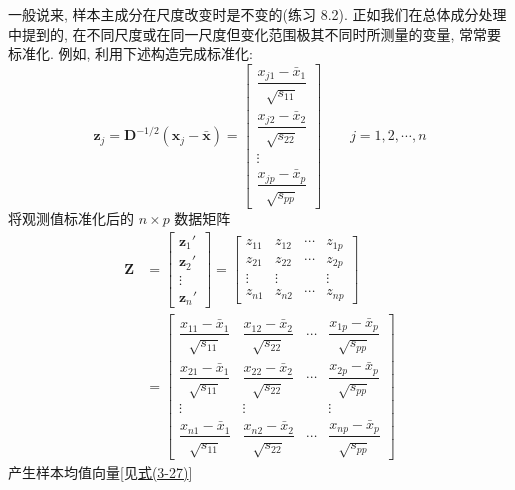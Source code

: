 一般说来, 样本主成分在尺度改变时是不变的(练习 8.2). 正如我们在总体成分处理中提到的, 在不同尺度或在同一尺度但变化范围极其不同时所测量的变量, 常常要标准化. 例如, 利用下述构造完成标准化:
\label{eq:8-25}
\begin{equation}
\mathbf{z}_j=\mathbf{D}^{-1/2}(\mathbf{x}_j-\bar{\mathbf{x}})=
\begin{bmatrix}
\dfrac{x_{j1}-\bar{x}_1}{\sqrt{s_{11}}}\\[6pt]
\dfrac{x_{j2}-\bar{x}_2}{\sqrt{s_{22}}}\\[6pt]
\vdots\\[4pt]
\dfrac{x_{jp}-\bar{x}_p}{\sqrt{s_{pp}}}
\end{bmatrix}
\qquad j=1,2,\cdots,n \tag{8-25}
\end{equation}
将观测值标准化后的 $n\times p$ 数据矩阵
\label{eq:8-26}
\begin{equation}
\begin{aligned}
\mathbf{Z}&=\begin{bmatrix}\mathbf{z}_1'\\\mathbf{z}_2'\\\vdots\\\mathbf{z}_n'\end{bmatrix}
=\begin{bmatrix}z_{11}&z_{12}&\cdots&z_{1p}\\
z_{21}&z_{22}&\cdots&z_{2p}\\
\vdots&\vdots&&\vdots\\
z_{n1}&z_{n2}&\cdots&z_{np}\end{bmatrix}\\
&=\begin{bmatrix}
\dfrac{x_{11}-\bar{x}_1}{\sqrt{s_{11}}}&\dfrac{x_{12}-\bar{x}_2}{\sqrt{s_{22}}}&\cdots&\dfrac{x_{1p}-\bar{x}_p}{\sqrt{s_{pp}}}\\[8pt]
\dfrac{x_{21}-\bar{x}_1}{\sqrt{s_{11}}}&\dfrac{x_{22}-\bar{x}_2}{\sqrt{s_{22}}}&\cdots&\dfrac{x_{2p}-\bar{x}_p}{\sqrt{s_{pp}}}\\[8pt]
\vdots&\vdots&&\vdots\\[4pt]
\dfrac{x_{n1}-\bar{x}_1}{\sqrt{s_{11}}}&\dfrac{x_{n2}-\bar{x}_2}{\sqrt{s_{22}}}&\cdots&\dfrac{x_{np}-\bar{x}_p}{\sqrt{s_{pp}}}
\end{bmatrix}
\end{aligned}
\tag{8-26}
\end{equation}
产生样本均值向量[见\hyperref[eq:3-27]{式(3-27)}]
